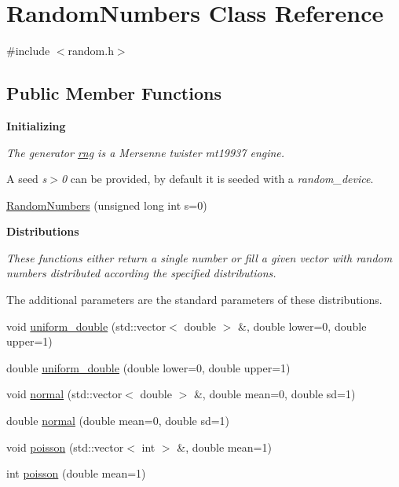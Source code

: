 \hypertarget{classRandomNumbers}{}\section{Random\+Numbers Class Reference}
\label{classRandomNumbers}


{\ttfamily \#include $<$random.\+h$>$}

\subsection*{Public Member Functions}
\begin{Indent}\textbf{ Initializing}\par
{\em The generator \hyperlink{classRandomNumbers_a15ceee85d6d00de12ae76c90aaec2f14}{rng} is a Mersenne twister {\itshape mt19937} engine.

A seed {\itshape s$>$0} can be provided, by default it is seeded with a {\itshape random\+\_\+device}. }\begin{DoxyCompactItemize}
\item 
\hyperlink{classRandomNumbers_aeceac66b253ad00f58e7b2252f18f609}{Random\+Numbers} (unsigned long int s=0)
\end{DoxyCompactItemize}
\end{Indent}
\begin{Indent}\textbf{ Distributions}\par
{\em These functions either return a single number or fill a given vector with random numbers distributed according the specified distributions.

The additional parameters are the standard parameters of these distributions. }\begin{DoxyCompactItemize}
\item 
void \hyperlink{classRandomNumbers_ae226c129494f9055ac37ed1af943d010}{uniform\+\_\+double} (std\+::vector$<$ double $>$ \&, double lower=0, double upper=1)
\item 
double \hyperlink{classRandomNumbers_a1e66bf9926ad3916f3804dd20ea393f1}{uniform\+\_\+double} (double lower=0, double upper=1)
\item 
void \hyperlink{classRandomNumbers_a4ef5917200da65aa267735d389bdf995}{normal} (std\+::vector$<$ double $>$ \&, double mean=0, double sd=1)
\item 
double \hyperlink{classRandomNumbers_abbfcbae72e7dbd048567dd5b8e2ce9d2}{normal} (double mean=0, double sd=1)
\item 
void \hyperlink{classRandomNumbers_a69e33058b8a923f9597cf13421d5fcd4}{poisson} (std\+::vector$<$ int $>$ \&, double mean=1)
\item 
int \hyperlink{classRandomNumbers_ac5bd95dddabde62a74a0d871a66ce2f0}{poisson} (double mean=1)
\end{DoxyCompactItemize}
\end{Indent}
